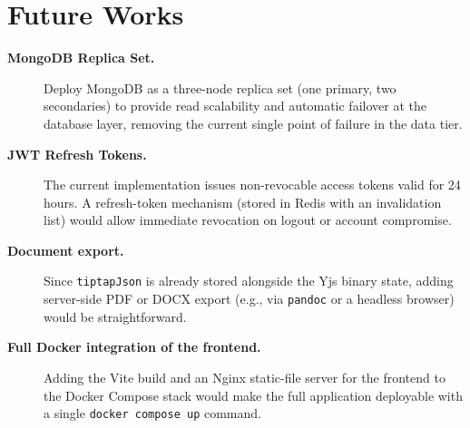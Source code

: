 \documentclass{scrartcl}
\begin{document}
  \section{Future Works}\label{future-works}

  \begin{description}
    \item[\textbf{MongoDB Replica Set.}] Deploy MongoDB as a three-node replica set (one
    primary, two secondaries) to provide read scalability and automatic failover at the
    database layer, removing the current single point of failure in the data tier.

    \item[\textbf{JWT Refresh Tokens.}] The current implementation issues non-revocable access
    tokens valid for 24 hours. A refresh-token mechanism (stored in Redis with an invalidation
    list) would allow immediate revocation on logout or account compromise.

    \item[\textbf{Document export.}] Since \texttt{tiptapJson} is already stored alongside the
    Yjs binary state, adding server-side PDF or DOCX export (e.g., via \texttt{pandoc} or a
    headless browser) would be straightforward.

    \item[\textbf{Full Docker integration of the frontend.}] Adding the Vite build and an
    Nginx static-file server for the frontend to the Docker Compose stack would make the full
    application deployable with a single \texttt{docker compose up} command.
  \end{description}
\end{document}
